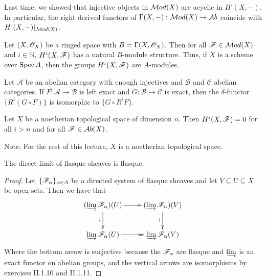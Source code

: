  \setcounter{lecture}{4}

\def\A{\mathcal{A}}

Last time, we showed that injective objects in $\mathcal{M}od(X)$ are
acyclic in $H^{\cdot}(X,-)$.  In particular, the right derived
functors of $\Gamma(X,-):\mathcal{M}od(X)\to \mathcal{A}b$ coincide with
$H^{\cdot}(X,-)|_{\mathcal{M}od(X)}$.

\begin{corollary}
Let $(X,\mathscr{O}_X)$ be a ringed space with $B=\Gamma(X,\mathscr{O}_X)$.  Then
for all $\mathscr{F}\in \mathcal{M}od(X)$ and $i\in \mathbb{N}$, $H^i(X,\mathscr{F})$ has a
natural $B$-module structure.  Thus, if $X$ is a scheme over
$\text{\rm Spec\,} A$, then the groups $H^i(X,\mathscr{F})$ are $A$-modules.
\end{corollary}

\begin{remark}
Let $\A$ be an abelian category with enough injectives and
$\mathcal{B}$ and $\mathcal{C}$ abelian categories.  If $F:\A\to
\mathcal{B}$ is left exact and $G:\mathcal{B}\to \mathcal{C}$ is
exact, then the $\delta$-functor $\{R^i(G\circ F)\}$ is isomorphic
to $\{G\circ R^iF\}$.
\end{remark}

\begin{theorem}
Let $X$ be a noetherian topological space of dimension $n$.  Then
$H^i(X,\mathscr{F})=0$ for all $i>n$ and for all $\mathscr{F}\in \mathcal{A}b(X)$.
\end{theorem}
Note: For the rest of this lecture, $X$ is a noetherian
topological space.

\begin{lemma}
The direct limit of flasque sheaves is flasque.
\end{lemma}
\begin{proof}
Let $\{\mathscr{F}_{\alpha}\}_{\alpha\in A}$ be a directed system of
flasque sheaves and let $V\subseteq U\subseteq X$ be open sets.
Then we have that
\[\xymatrix{
 (\varinjlim \F_{\alpha})(U) \ar[r]\ar[d]_{\wr} & (\varinjlim
 \F_{\alpha})(V) \ar[d]_{\wr}\\
 \varinjlim \F_{\alpha}(U) \ar@{->>}[r] & \varinjlim
 \F_{\alpha}(V)
}\]
 Where the bottom arrow is surjective because the $\mathscr{F}_{\alpha}$
 are flasque and $\varinjlim$ is an exact functor on abelian
 groups, and the vertical arrows are isomorphisms by exercises
 II.1.10 and II.1.11.
\end{proof}


